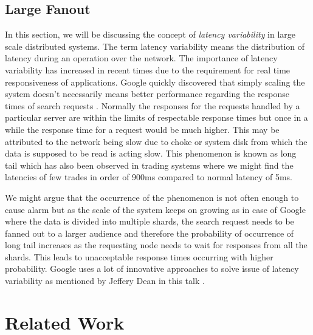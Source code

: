 \documentclass[a4paper,11pt]{kth-mag}
\begin{document}
\section{Large Fanout}

In this section, we will be discussing the concept of \textit{latency variability} in large scale distributed systems. The term latency variability means the distribution of latency during an operation over the network. The importance of latency variability has increased in recent times due to the requirement for real time responsiveness of applications. Google quickly discovered that simply scaling the system doesn't necessarily means better performance regarding the response times of search requests \cite{tamingTail}. Normally the responses for the requests handled by a particular server are within the limits of respectable response times but once in a while the response time for a request would be much higher. This may be attributed to the network being slow due to choke or system disk from which the data is supposed to be read is acting slow. This phenomenon is known as long tail which has also been observed in trading systems where we might find the latencies of few trades in order of 900ms compared to normal latency of 5ms.

\par We might argue that the occurrence of the phenomenon is not often enough to cause alarm but as the scale of the system keeps on growing as in case of Google where the data is divided into multiple shards, the search request needs to be fanned out to a larger audience and therefore the probability of occurrence of long tail increases as the requesting node needs to wait for responses from all the shards. This leads to unacceptable response times occurring with higher probability. Google uses a lot of innovative approaches to solve issue of latency variability as mentioned by Jeffery Dean in this talk \cite{jeffDean}. 


\chapter{Related Work}
\label{chap:related_work}
\end{document}
